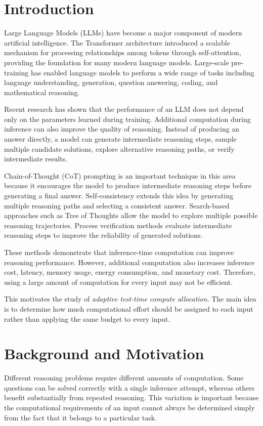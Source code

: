 \documentclass[12pt,a4paper,titlepage]{report}
\begin{document}
\section{Introduction}

Large Language Models (LLMs) have become a major component of modern artificial intelligence. The Transformer architecture introduced a scalable mechanism for processing relationships among tokens through self-attention, providing the foundation for many modern language models. Large-scale pre-training has enabled language models to perform a wide range of tasks including language understanding, generation, question answering, coding, and mathematical reasoning.

Recent research has shown that the performance of an LLM does not depend only on the parameters learned during training. Additional computation during inference can also improve the quality of reasoning. Instead of producing an answer directly, a model can generate intermediate reasoning steps, sample multiple candidate solutions, explore alternative reasoning paths, or verify intermediate results.

Chain-of-Thought (CoT) prompting is an important technique in this area because it encourages the model to produce intermediate reasoning steps before generating a final answer. Self-consistency extends this idea by generating multiple reasoning paths and selecting a consistent answer. Search-based approaches such as Tree of Thoughts allow the model to explore multiple possible reasoning trajectories. Process verification methods evaluate intermediate reasoning steps to improve the reliability of generated solutions.

These methods demonstrate that inference-time computation can improve reasoning performance. However, additional computation also increases inference cost, latency, memory usage, energy consumption, and monetary cost. Therefore, using a large amount of computation for every input may not be efficient.

This motivates the study of \textit{adaptive test-time compute allocation}. The main idea is to determine how much computational effort should be assigned to each input rather than applying the same budget to every input.

\section{Background and Motivation}

Different reasoning problems require different amounts of computation. Some questions can be solved correctly with a single inference attempt, whereas others benefit substantially from repeated reasoning. This variation is important because the computational requirements of an input cannot always be determined simply from the fact that it belongs to a particular task.
\end{document}
